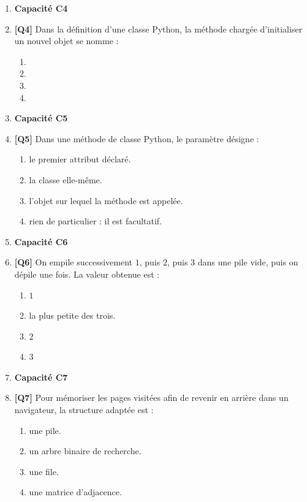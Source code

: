 \begin{enumerate}
\item[] \textbf{Capacité C4}

\item \textbf{[Q4]} Dans la définition d'une classe Python, la méthode chargée d'initialiser un nouvel objet se nomme :
  \begin{enumerate}[label=\Alph*.]
    \item {}
    \item {}
    \item {}
    \item {}
  \end{enumerate}

\item[] \textbf{Capacité C5}

\item \textbf{[Q5]} Dans une méthode de classe Python, le paramètre  désigne :
  \begin{enumerate}[label=\Alph*.]
    \item le premier attribut déclaré.
    \item la classe elle-même.
    \item l'objet sur lequel la méthode est appelée.
    \item rien de particulier : il est facultatif.
  \end{enumerate}

\item[] \textbf{Capacité C6}

\item \textbf{[Q6]} On empile successivement $1$, puis $2$, puis $3$ dans une pile vide, puis on dépile une fois. La valeur obtenue est :
  \begin{enumerate}[label=\Alph*.]
    \item $1$
    \item la plus petite des trois.
    \item $2$
    \item $3$
  \end{enumerate}

\item[] \textbf{Capacité C7}

\item \textbf{[Q7]} Pour mémoriser les pages visitées afin de revenir en arrière dans un navigateur, la structure adaptée est :
  \begin{enumerate}[label=\Alph*.]
    \item une pile.
    \item un arbre binaire de recherche.
    \item une file.
    \item une matrice d'adjacence.
  \end{enumerate}


\end{enumerate}
